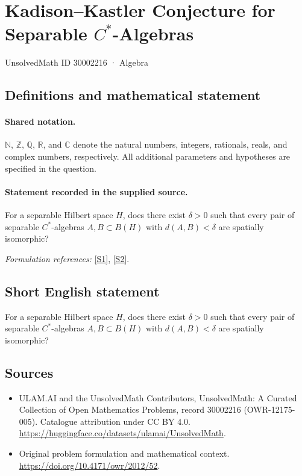 \documentclass[11pt]{article}
\newcommand{\sref}[2]{\hyperlink{source:#1:#2}{[S#2]}}
\begin{document}
\setcounter{section}{30002215}
\section{\texorpdfstring{Kadison–Kastler Conjecture for Separable $C^*$-Algebras}{Kadison–Kastler Conjecture for Separable C\textasciicircum{}*-Algebras}}\label{30002216}
{\small UnsolvedMath ID 30002216 · Algebra}
\subsection{Definitions and mathematical statement}

\paragraph{Shared notation.}$\mathbb N$, $\mathbb Z$, $\mathbb Q$, $\mathbb R$, and $\mathbb C$ denote the natural numbers, integers, rationals, reals, and complex numbers, respectively. All additional parameters and hypotheses are specified in the question.


\paragraph{Statement recorded in the supplied source.}
For a separable Hilbert space $H$, does there exist $\delta>0$ such that every pair of separable $C^*$-algebras $A,B\subset B(H)$ with $d(A,B)<\delta$ are spatially isomorphic?
\par\smallskip\textit{Formulation references:} \sref{30002216}{1}, \sref{30002216}{2}.
\subsection{Short English statement}
For a separable Hilbert space $H$, does there exist $\delta>0$ such that every pair of separable $C^*$-algebras $A,B\subset B(H)$ with $d(A,B)<\delta$ are spatially isomorphic?
\subsection{Sources}
\begin{itemize}
\item[\hypertarget{source:30002216:1}{S1}] ULAM.AI and the UnsolvedMath Contributors, UnsolvedMath: A Curated Collection of Open Mathematics Problems, record 30002216 (OWR-12175-005). Catalogue attribution under CC BY 4.0.
\url{https://huggingface.co/datasets/ulamai/UnsolvedMath}.
\item[\hypertarget{source:30002216:2}{S2}] Original problem formulation and mathematical context.
\url{https://doi.org/10.4171/owr/2012/52}.
\end{itemize}
\label{end:30002216}
\end{document}
